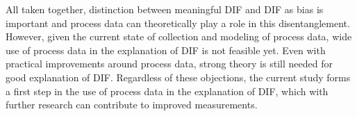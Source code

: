 \documentclass{interact}
\begin{document}
All taken together, distinction between meaningful DIF and DIF as bias is important and process data can theoretically play a role in this disentanglement. However, given the current state of collection and modeling of process data, wide use of process data in the explanation of DIF is not feasible yet. Even with practical improvements around process data, strong theory is still needed for good explanation of DIF. Regardless of these objections, the current study forms a first step in the use of process data in the explanation of DIF, which with further research can contribute to improved measurements.

\newpage
\printbibliography
\end{document}
